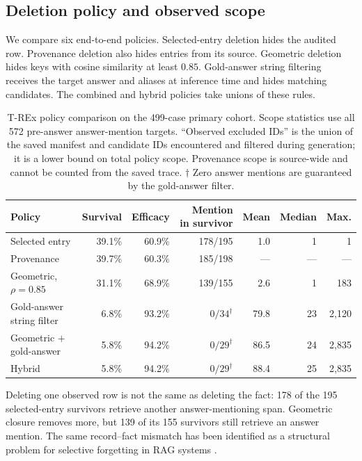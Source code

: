 \documentclass[11pt]{article}
\newcommand{\pct}[1]{#1\%}
\begin{document}
\subsection{Deletion policy and observed scope}

We compare six end-to-end policies. Selected-entry deletion hides the audited
row. Provenance deletion also hides entries from its source. Geometric
deletion hides keys with cosine similarity at least \(0.85\). Gold-answer
string filtering receives the target answer and aliases at inference time and
hides matching candidates. The combined and hybrid policies take unions of
these rules.

\begin{table}[H]
\centering
\caption{T-REx policy comparison on the 499-case primary cohort. Scope
statistics use all 572 pre-answer answer-mention targets. ``Observed excluded
IDs'' is the union of the saved manifest and candidate IDs encountered and
filtered during generation; it is a lower bound on total policy scope.
Provenance scope is source-wide and cannot be counted from the saved trace.
\(\dagger\) Zero answer mentions are guaranteed by the gold-answer filter.}
\label{tab:policies}
\scriptsize
\begin{tabular}{lrrrrrr}
\toprule
Policy & Survival & Efficacy & Mention in survivor & Mean & Median & Max. \\
\midrule
Selected entry & \pct{39.1} & \pct{60.9} & 178/195 & 1.0 & 1 & 1 \\
Provenance & \pct{39.7} & \pct{60.3} & 185/198 & --- & --- & --- \\
Geometric, \(\rho=0.85\) & \pct{31.1} & \pct{68.9} & 139/155 & 2.6 & 1 & 183 \\
Gold-answer string filter & \pct{6.8} & \pct{93.2} & \(0/34^\dagger\) &
79.8 & 23 & 2,120 \\
Geometric \(+\) gold-answer & \pct{5.8} & \pct{94.2} &
\(0/29^\dagger\) & 86.5 & 24 & 2,835 \\
Hybrid & \pct{5.8} & \pct{94.2} & \(0/29^\dagger\) &
88.4 & 25 & 2,835 \\
\bottomrule
\end{tabular}
\end{table}

Deleting one observed row is not the same as deleting the fact: 178 of the
195 selected-entry survivors retrieve another answer-mentioning span.
Geometric closure removes more, but 139 of its 155 survivors still retrieve
an answer mention. The same record--fact mismatch has been identified as a
structural problem for selective forgetting in RAG systems
\cite{tavakoli2026deletion}.
\end{document}
